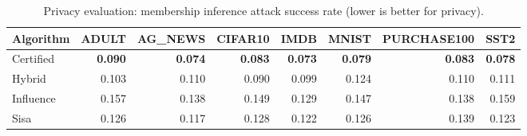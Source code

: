 \begin{table}[t]
\centering
\caption{Privacy evaluation: membership inference attack success rate (lower is better for privacy).}
\label{tab:privacy}
\small
\begin{tabular}{lrrrrrrr}
\toprule
Algorithm & ADULT & AG\_NEWS & CIFAR10 & IMDB & MNIST & PURCHASE100 & SST2 \\
\midrule
Certified & \textbf{0.090} & \textbf{0.074} & \textbf{0.083} & \textbf{0.073} & \textbf{0.079} & \textbf{0.083} & \textbf{0.078} \\
Hybrid & 0.103 & 0.110 & 0.090 & 0.099 & 0.124 & 0.110 & 0.111 \\
Influence & 0.157 & 0.138 & 0.149 & 0.129 & 0.147 & 0.138 & 0.159 \\
Sisa & 0.126 & 0.117 & 0.128 & 0.122 & 0.126 & 0.139 & 0.123 \\
\bottomrule
\end{tabular}
\end{table}